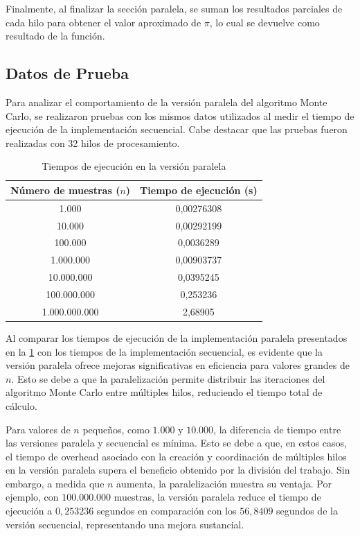 \documentclass[a4paper, 10pt, onecolumn]{IEEEtran}
\begin{document}
Finalmente, al finalizar la sección paralela, se suman los resultados parciales de cada hilo para obtener el valor aproximado de $\pi$, lo cual se devuelve como resultado de la función.

\subsection{Datos de Prueba}
Para analizar el comportamiento de la versión paralela del algoritmo Monte Carlo, se realizaron pruebas con los mismos datos utilizados al medir el tiempo de ejecución de la implementación secuencial. Cabe destacar que las pruebas fueron realizadas con 32 hilos de procesamiento.

\begin{table}[H]
	\centering
	\begin{tabular}{|c|c|}
		\hline
		\textbf{Número de muestras ($n$)} & \textbf{Tiempo de ejecución (s)} \\
		\hline
		1.000         & 0,00276308\\
		10.000        & 0,00292199 \\
		100.000       & 0,0036289 \\
		1.000.000     & 0,00903737 \\
		10.000.000    & 0,0395245 \\
		100.000.000   & 0,253236 \\
		1.000.000.000 & 2,68905 \\
		\hline
	\end{tabular}
	\caption{Tiempos de ejecución en la versión paralela}
	\label{tab:parallel_execution_times}
\end{table}

Al comparar los tiempos de ejecución de la implementación paralela presentados en la \cref{tab:parallel_execution_times} con los tiempos de la implementación secuencial, es evidente que la versión paralela ofrece mejoras significativas en eficiencia para valores grandes de $n$. Esto se debe a que la paralelización permite distribuir las iteraciones del algoritmo Monte Carlo entre múltiples hilos, reduciendo el tiempo total de cálculo.

Para valores de $n$ pequeños, como $1.000$ y $10.000$, la diferencia de tiempo entre las versiones paralela y secuencial es mínima. Esto se debe a que, en estos casos, el tiempo de overhead asociado con la creación y coordinación de múltiples hilos en la versión paralela supera el beneficio obtenido por la división del trabajo. Sin embargo, a medida que $n$ aumenta, la paralelización muestra su ventaja. Por ejemplo, con $100.000.000$ muestras, la versión paralela reduce el tiempo de ejecución a $0,253236$ segundos en comparación con los $56,8409$ segundos de la versión secuencial, representando una mejora sustancial.
\end{document}
